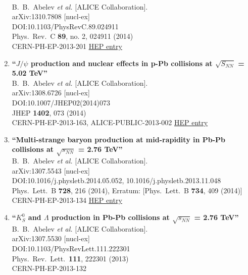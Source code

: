 \begin{enumerate}
  \\{}B.~B.~Abelev {\it et al.} [ALICE Collaboration].
  \\{}arXiv:1310.7808 [nucl-ex]
  \\{}DOI:10.1103/PhysRevC.89.024911
  \\{}Phys.\ Rev.\ C {\bf 89}, no. 2, 024911 (2014)
  \\{}CERN-PH-EP-2013-201
\href{http://inspirehep.net/record/1262523}{HEP entry}
\item%
{\bf ``$J/\psi$ production and nuclear effects in p-Pb collisions at $\sqrt{S_{NN}}$ = 5.02 TeV''}
  \\{}B.~B.~Abelev {\it et al.} [ALICE Collaboration].
  \\{}arXiv:1308.6726 [nucl-ex]
  \\{}DOI:10.1007/JHEP02(2014)073
  \\{}JHEP {\bf 1402}, 073 (2014)
  \\{}CERN-PH-EP-2013-163, ALICE-PUBLIC-2013-002
\href{http://inspirehep.net/record/1251898}{HEP entry}
\item%
{\bf ``Multi-strange baryon production at mid-rapidity in Pb-Pb collisions at $\sqrt{s_{NN}}$ = 2.76 TeV''}
  \\{}B.~B.~Abelev {\it et al.} [ALICE Collaboration].
  \\{}arXiv:1307.5543 [nucl-ex]
  \\{}DOI:10.1016/j.physletb.2014.05.052, 10.1016/j.physletb.2013.11.048
  \\{}Phys.\ Lett.\ B {\bf 728}, 216 (2014), Erratum: [Phys.\ Lett.\ B {\bf 734}, 409 (2014)]
  \\{}CERN-PH-EP-2013-134
\href{http://inspirehep.net/record/1243865}{HEP entry}
\item%
{\bf ``$K^0_S$ and $\Lambda$ production in Pb-Pb collisions at $\sqrt{s_{NN}}$ = 2.76 TeV''}
  \\{}B.~B.~Abelev {\it et al.} [ALICE Collaboration].
  \\{}arXiv:1307.5530 [nucl-ex]
  \\{}DOI:10.1103/PhysRevLett.111.222301
  \\{}Phys.\ Rev.\ Lett.\  {\bf 111}, 222301 (2013)
  \\{}CERN-PH-EP-2013-132

\end{enumerate}
